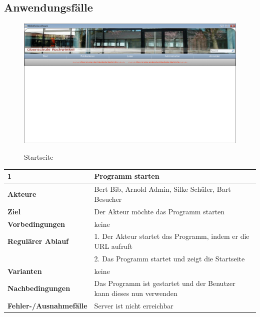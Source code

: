 \documentclass[fontsize=12pt,paper=a4,twoside]{scrartcl}
\begin{document}
\subsection{Anwendungsfälle}
\begin{figure}[htbp]
\caption{Startseite}
\includegraphics[width=1\textwidth]{WebApp-Screens/Startscreen-loggedOut.png}
  \label{startseite}
\end{figure}

\begin{table}[htbp]
\label{1}
\begin{tabular}{|l|p{10cm}|}
\hline 
\textbf{1} & \textbf{Programm starten} \\ \hline
\textbf{Akteure} & Bert Bib, Arnold Admin, Silke Schüler, Bart Besucher\\ \hline
\textbf{Ziel} & Der Akteur möchte das Programm starten  \\ \hline
\textbf{Vorbedingungen} & keine \\ \hline
\textbf{Regulärer Ablauf} & 
1. Der Akteur startet das Programm, indem er die URL aufruft \\
&2. Das Programm startet und zeigt die Startseite \\ \hline
\textbf{Varianten} & keine \\ \hline
\textbf{Nachbedingungen} & Das Programm ist gestartet und der Benutzer kann dieses nun verwenden \\ \hline
\textbf{Fehler-/Ausnahmefälle} & Server ist nicht erreichbar \\ \hline
\end{tabular}
\end{table}
\end{document}
